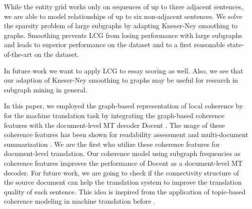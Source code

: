 While the entity grid works only on sequences of up to three adjacent
sentences, we are able to model relationships of up to six
non-adjacent sentences. We solve the sparsity problem of large
subgraphs by adapting Kneser-Ney smoothing to graphs. Smoothing
prevents LCG from losing performance with large subgraphs and leads to
superior performance on the  dataset and to a
first reasonable state-of-the-art on the  dataset.

In future work we want to apply LCG to essay scoring as well. Also, we
see that our adaption of Kneser-Ney smoothing to graphs may be useful
for research in subgraph mining in general.

In this paper, we employed the graph-based representation of local coherence by  
for the machine translation task by integrating the graph-based coherence features with the document-level MT decoder Docent \cite{Hardmeier2012a, Hardmeier2013a}. 
The usage of these coherence features has been shown for readability assessment and multi-document summarization \cite{Parveen2016,Mesgar2016}. We are the first who utilize these coherence features for document-level translation.
Our coherence model using subgraph frequencies  as coherence features improves the performance of Docent as a document-level MT decoder.
For future work, we are going to check if the connectivity structure of the source document can help the translation system to improve the translation quality of each sentence. This idea is inspired from the application of topic-based coherence modeling in machine translation before \cite{Xiong2013}.

